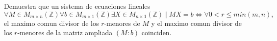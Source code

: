 \question
Demuestra que un sistema de ecuaciones lineales 
$
\forall M \in M_{m \times n}(\mathbb{Z})
\forall b \in M_{m \times 1}(\mathbb{Z})
\exists X \in M_{n \times 1}(\mathbb{Z}) \mid
MX = b
\iff
\forall 0 < r \le min(m, n),$ el maximo comun divisor de los $r$-menores de $M$ 
y el maximo comun divisor de los $r$-menores de la matriz ampliada $(M:b)$ 
coinciden.